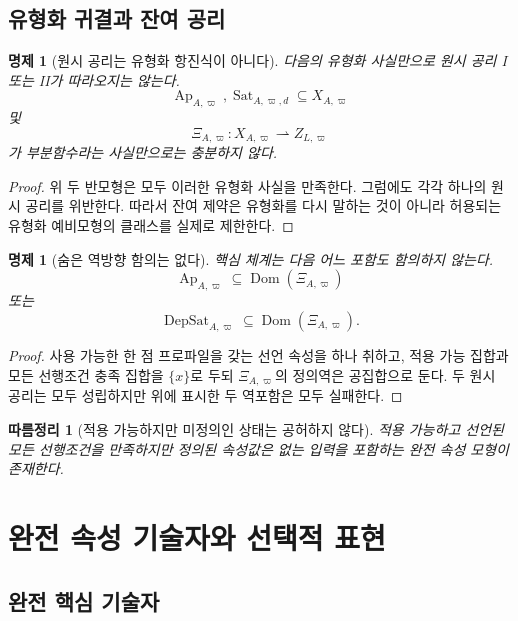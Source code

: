 \documentclass[11pt]{article}
\newcommand{\Ap}{\operatorname{Ap}}
\newcommand{\DepSat}{\operatorname{DepSat}}
\newcommand{\Sat}{\operatorname{Sat}}
\newcommand{\Dom}{\operatorname{Dom}}
\newtheorem{proposition}[theorem]{명제}
\newtheorem{corollary}[theorem]{따름정리}
\theoremstyle{definition}
\theoremstyle{remark}
\begin{document}
\subsection{유형화 귀결과 잔여 공리}

\begin{proposition}[원시 공리는 유형화 항진식이 아니다]
다음의 유형화 사실만으로 원시 공리 I 또는 II가 따라오지는 않는다.
\[
\Ap_{A,\varpi},\Sat_{A,\varpi,d}\subseteq X_{A,\varpi}
\]
및
\[
\Xi_{A,\varpi}:X_{A,\varpi}\rightharpoonup Z_{L,\varpi}
\]
가 부분함수라는 사실만으로는 충분하지 않다.
\end{proposition}

\begin{proof}
위 두 반모형은 모두 이러한 유형화 사실을 만족한다.
그럼에도 각각 하나의 원시 공리를 위반한다.
따라서 잔여 제약은 유형화를 다시 말하는 것이 아니라 허용되는 유형화 예비모형의 클래스를 실제로 제한한다.
\end{proof}

\begin{proposition}[숨은 역방향 함의는 없다]
핵심 체계는 다음 어느 포함도 함의하지 않는다.
\[
\Ap_{A,\varpi}\subseteq\Dom(\Xi_{A,\varpi})
\]
또는
\[
\DepSat_{A,\varpi}\subseteq\Dom(\Xi_{A,\varpi}).
\]
\end{proposition}

\begin{proof}
사용 가능한 한 점 프로파일을 갖는 선언 속성을 하나 취하고, 적용 가능 집합과 모든 선행조건 충족 집합을 \(\{x\}\)로 두되 \(\Xi_{A,\varpi}\)의 정의역은 공집합으로 둔다.
두 원시 공리는 모두 성립하지만 위에 표시한 두 역포함은 모두 실패한다.
\end{proof}

\begin{corollary}[적용 가능하지만 미정의인 상태는 공허하지 않다]
적용 가능하고 선언된 모든 선행조건을 만족하지만 정의된 속성값은 없는 입력을 포함하는 완전 속성 모형이 존재한다.
\end{corollary}

\section{완전 속성 기술자와 선택적 표현}
\label{sec:descriptor-representation}

\subsection{완전 핵심 기술자}
\end{document}
